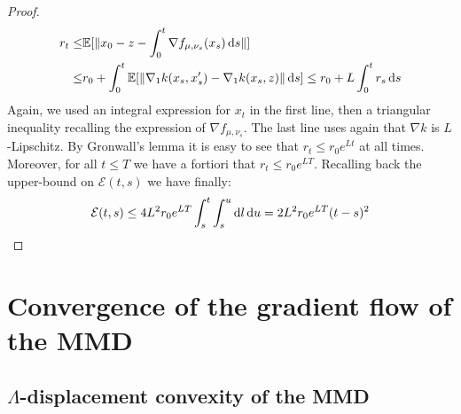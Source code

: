 \begin{proof}
	\begin{align*}
		r_t\leq & \mathbb{E}[\Vert x_0  - z -\int_0^t \nabla f_{\mu,\nu_s}(x_s) \mathop{}\!\mathrm{d} s \Vert]\\
		\leq &
		r_0 +\int_0^t \mathbb{E}[\Vert \nabla_1 k(x_s,x_s')- \nabla_1 k(x_s,z) \Vert \mathop{}\!\mathrm{d} s]\leq 
		r_0  + L\int_0^t r_s \mathop{}\!\mathrm{d} s
	\end{align*}
	Again, we used an integral expression for $x_t$ in the first line, then a triangular inequality recalling the expression of $\nabla f_{\mu,\nu_s}$. The last line uses again that $\nabla k$ is $L$-Lipschitz. By Gronwall's lemma it is easy to see that $r_t \leq r_0e^{Lt}$ at all times. Moreover, for all $t\leq T$ we have a fortiori  that $r_t \leq r_0 e^{LT}$.
	Recalling back the upper-bound on $\mathcal{E}(t,s)$ we have finally:
	\[
	\mathcal{E}(t,s)\leq 4L^2 r_0 e^{LT} \int_{s}^t \int_s^u \mathop{}\!\mathrm{d} l \mathop{}\!\mathrm{d} u = 2L^2 r_0 e^{LT}(t-s)^2
	\] 
\end{proof}



%	
%	
%	
%



\section{Convergence of the gradient flow of the MMD}\label{sec:appendix_convergence}
\subsection{$\Lambda$-displacement convexity of the MMD}\label{subsec:appendix_lambda_convexity}

